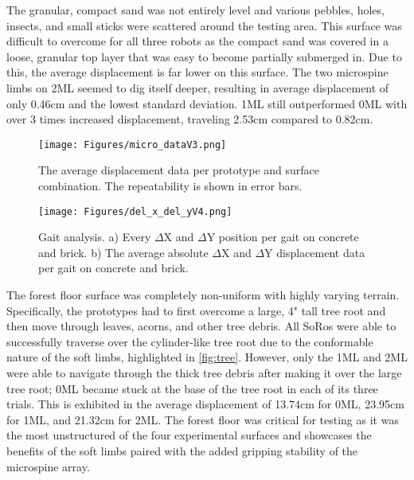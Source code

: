 The granular, compact sand was not entirely level and various pebbles, holes, insects, and small sticks were scattered around the testing area. This surface was difficult to overcome for all three robots as the compact sand was covered in a loose, granular top layer that was easy to become partially submerged in. Due to this, the average displacement is far lower on this surface. The two microspine limbs on 2ML seemed to dig itself deeper, resulting in average displacement of only 0.46cm and the lowest standard deviation. 1ML still outperformed 0ML with over 3 times increased displacement, traveling 2.53cm compared to 0.82cm.


\begin{figure}[!h]
    \centering
    \texttt{[image: Figures/micro\_dataV3.png]}
    \caption{The average displacement data per prototype and surface combination. The repeatability is shown in error bars.}
    \label{fig:data}
\end{figure}


\begin{figure}[!h]
    \centering
    \texttt{[image: Figures/del\_x\_del\_yV4.png]}
    \caption{Gait analysis. a) Every $\Delta$X and $\Delta$Y position per gait on concrete and brick. b) The average absolute $\Delta$X and $\Delta$Y displacement data per gait on concrete and brick.}
    \label{fig:delta}
\end{figure}

The forest floor surface was completely non-uniform with highly varying terrain. Specifically, the prototypes had to first overcome a large, 4" tall tree root and then move through leaves, acorns, and other tree debris. All SoRos were able to successfully traverse over the cylinder-like tree root due to the conformable nature of the soft limbs, highlighted in \Fig \ref{fig:tree}. However, only the 1ML and 2ML were able to navigate through the thick tree debris after making it over the large tree root; 0ML became stuck at the base of the tree root in each of its three trials. This is exhibited in the average displacement of 13.74cm for 0ML, 23.95cm for 1ML, and 21.32cm for 2ML. The forest floor was critical for testing as it was the most unstructured of the four experimental surfaces and showcases the benefits of the soft limbs paired with the added gripping stability of the microspine array.

